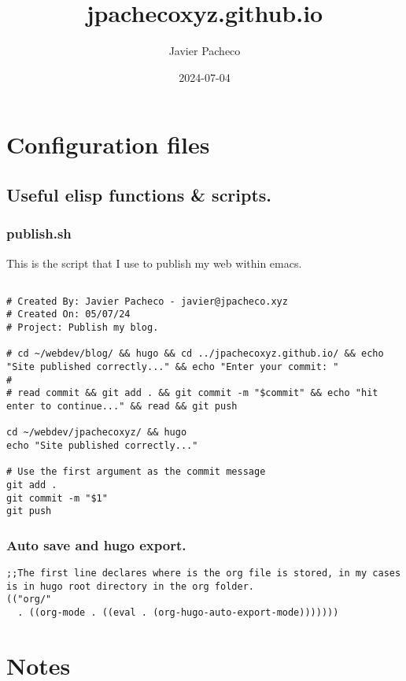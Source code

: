 \documentclass[11pt]{article}
\author{Javier Pacheco}
\date{2024-07-04}
\title{jpachecoxyz.github.io}
\begin{document}
\maketitle
\tableofcontents


\section{Configuration files}
\label{sec:orgf8deb39}
\subsection{Useful elisp functions \& scripts.}
\label{sec:org79c861a}
\subsubsection{publish.sh}
\label{sec:org6cb4823}
This is the script that I use to publish my web within emacs.
\begin{verbatim}

# Created By: Javier Pacheco - javier@jpacheco.xyz
# Created On: 05/07/24
# Project: Publish my blog.

# cd ~/webdev/blog/ && hugo && cd ../jpachecoxyz.github.io/ && echo "Site published correctly..." && echo "Enter your commit: "
#
# read commit && git add . && git commit -m "$commit" && echo "hit enter to continue..." && read && git push

cd ~/webdev/jpachecoxyz/ && hugo
echo "Site published correctly..."

# Use the first argument as the commit message
git add .
git commit -m "$1"
git push
\end{verbatim}
\subsubsection{Auto save and hugo export.}
\label{sec:orgcbec4ad}
\begin{verbatim}
;;The first line declares where is the org file is stored, in my cases is in hugo root directory in the org folder.
(("org/"
  . ((org-mode . ((eval . (org-hugo-auto-export-mode)))))))
\end{verbatim}
\section{Notes}
\label{sec:orgdce5be7}
\end{document}
